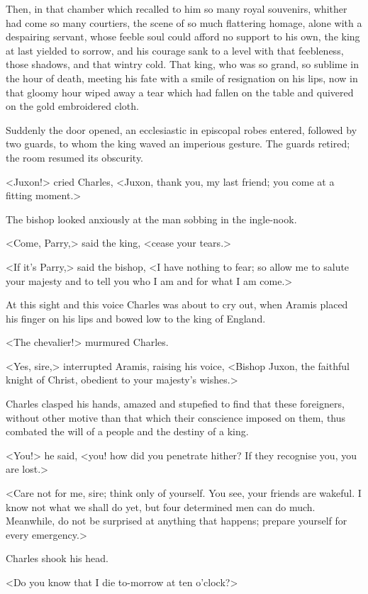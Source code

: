 Then, in that chamber which recalled to him so many royal souvenirs, whither had come so many courtiers, the scene of so much flattering homage, alone with a despairing servant, whose feeble soul could afford no support to his own, the king at last yielded to sorrow, and his courage sank to a level with that feebleness, those shadows, and that wintry cold. That king, who was so grand, so sublime in the hour of death, meeting his fate with a smile of resignation on his lips, now in that gloomy hour wiped away a tear which had fallen on the table and quivered on the gold embroidered cloth.

Suddenly the door opened, an ecclesiastic in episcopal robes entered, followed by two guards, to whom the king waved an imperious gesture. The guards retired; the room resumed its obscurity.

<Juxon!> cried Charles, <Juxon, thank you, my last friend; you come at a fitting moment.>

The bishop looked anxiously at the man sobbing in the ingle-nook.

<Come, Parry,> said the king, <cease your tears.>

<If it's Parry,> said the bishop, <I have nothing to fear; so allow me to salute your majesty and to tell you who I am and for what I am come.>

At this sight and this voice Charles was about to cry out, when Aramis placed his finger on his lips and bowed low to the king of England.

<The chevalier!> murmured Charles.

<Yes, sire,> interrupted Aramis, raising his voice, <Bishop Juxon, the faithful knight of Christ, obedient to your majesty's wishes.>

Charles clasped his hands, amazed and stupefied to find that these foreigners, without other motive than that which their conscience imposed on them, thus combated the will of a people and the destiny of a king.

<You!> he said, <you! how did you penetrate hither? If they recognise you, you are lost.>

<Care not for me, sire; think only of yourself. You see, your friends are wakeful. I know not what we shall do yet, but four determined men can do much. Meanwhile, do not be surprised at anything that happens; prepare yourself for every emergency.>

Charles shook his head.

<Do you know that I die to-morrow at ten o'clock?>

